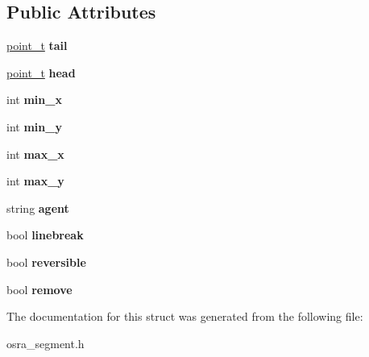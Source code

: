 \subsection*{Public Attributes}
\begin{DoxyCompactItemize}
\item 
\hypertarget{structarrow__s_a8a056bd812d2d0d0c21ad354fede1e75}{\hyperlink{structpoint__s}{point\-\_\-t} {\bfseries tail}}\label{structarrow__s_a8a056bd812d2d0d0c21ad354fede1e75}

\item 
\hypertarget{structarrow__s_a4aae27417cf37a108a8e597cb3e50a77}{\hyperlink{structpoint__s}{point\-\_\-t} {\bfseries head}}\label{structarrow__s_a4aae27417cf37a108a8e597cb3e50a77}

\item 
\hypertarget{structarrow__s_adcab86ca62919099bafa6de2ea134677}{int {\bfseries min\-\_\-x}}\label{structarrow__s_adcab86ca62919099bafa6de2ea134677}

\item 
\hypertarget{structarrow__s_a9c8cbcf508dd19f1e7332a3e26c0e1b2}{int {\bfseries min\-\_\-y}}\label{structarrow__s_a9c8cbcf508dd19f1e7332a3e26c0e1b2}

\item 
\hypertarget{structarrow__s_aeae076b3a46ff5006633066f809c5027}{int {\bfseries max\-\_\-x}}\label{structarrow__s_aeae076b3a46ff5006633066f809c5027}

\item 
\hypertarget{structarrow__s_a39a482502eba5512ac52fe7bf5da1ab9}{int {\bfseries max\-\_\-y}}\label{structarrow__s_a39a482502eba5512ac52fe7bf5da1ab9}

\item 
\hypertarget{structarrow__s_a8344a62187ee374a6b9d3bc40f8e1db3}{string {\bfseries agent}}\label{structarrow__s_a8344a62187ee374a6b9d3bc40f8e1db3}

\item 
\hypertarget{structarrow__s_aadb5c8b084bba487adc177b02cd6ac71}{bool {\bfseries linebreak}}\label{structarrow__s_aadb5c8b084bba487adc177b02cd6ac71}

\item 
\hypertarget{structarrow__s_a99c19a7f6996f72d48580ad7be4b556d}{bool {\bfseries reversible}}\label{structarrow__s_a99c19a7f6996f72d48580ad7be4b556d}

\item 
\hypertarget{structarrow__s_aa1d193e7cd59b84d4da6279c3b82b793}{bool {\bfseries remove}}\label{structarrow__s_aa1d193e7cd59b84d4da6279c3b82b793}

\end{DoxyCompactItemize}


The documentation for this struct was generated from the following file\-:\begin{DoxyCompactItemize}
\item 
osra\-\_\-segment.\-h\end{DoxyCompactItemize}
